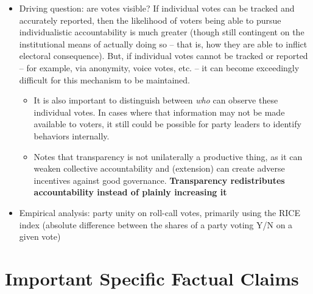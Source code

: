 \documentclass[12pt]{article}
\begin{document}
\begin{itemize}[leftmargin=*, itemsep=4pt]
    \item Driving question: are votes visible? If individual votes can be tracked and accurately reported, then the likelihood of voters being able to pursue individualistic accountability is much greater (though still contingent on the institutional means of actually doing so -- that is, how they are able to inflict electoral consequence). But, if individual votes cannot be tracked or reported -- for example, via anonymity, voice votes, etc. -- it can become exceedingly difficult for this mechanism to be maintained.
    \begin{itemize}
        \item It is also important to distinguish between \emph{who} can observe these individual votes. In cases where that information may not be made available to voters, it still could be possible for party leaders to identify behaviors internally.
        \item Notes that transparency is not unilaterally a productive thing, as it can weaken collective accountability and (extension) can create adverse incentives against good governance. \textbf{Transparency redistributes accountability instead of plainly increasing it}
    \end{itemize}
    \item Empirical analysis: party unity on roll-call votes, primarily using the RICE index (absolute difference between the shares of a party voting Y/N on a given vote)
\end{itemize}


\section{Important Specific Factual Claims}
\end{document}
